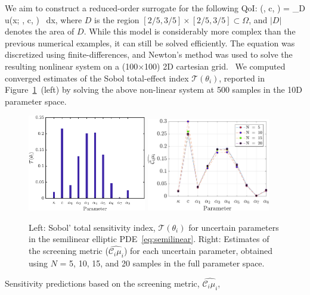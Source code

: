 We aim to construct a reduced-order surrogate for the following QoI:
\be
{}(\kappa, c, \theta) =  \int_D u(x; \kappa, c, \theta) \, dx, 
\label{eq:qoi}
\ee
%
where $D$ is the region $[2/5, 3/5] \times [2/5, 3/5] \subset \Omega$, 
and $|D|$ denotes the area of $D$. 
While this model is considerably more complex than the previous numerical
examples, it can still be solved efficiently.
The equation was discretized using finite-differences, and Newton's method
was used to solve the resulting nonlinear system on a (100$\times$100) 2D
cartesian grid.~ 
We computed converged estimates of the Sobol
total-effect index $\mathcal{T}(\theta_i)$, reported 
in Figure~\ref{fig:sense_elliptic}~(left) by solving the above non-linear
system at 500 samples in the 10D parameter space. 
%
\begin{figure}[htbp]
 \begin{center}
  \includegraphics[width=0.46\textwidth]{./Figures/sense_elliptic}
  \includegraphics[width=0.48\textwidth]{./Figures/ub_conv_elliptic}
\caption{
Left: Sobol' total sensitivity index, $\mathcal{T}(\theta_i)$ for uncertain parameters in the 
semilinear elliptic PDE~\eqref{eq:semilinear}. Right: 
Estimates of the screening metric ($\widehat{\mathcal{C}_i\mu_i}$) for each uncertain parameter,
obtained using $N$ = 5, 10, 15, and 20 samples in the full parameter space.}
\label{fig:sense_elliptic}
\end{center}
\end{figure}
%
Sensitivity predictions based on the screening metric, $\widehat{\mathcal{C}_i\mu_i}$,
